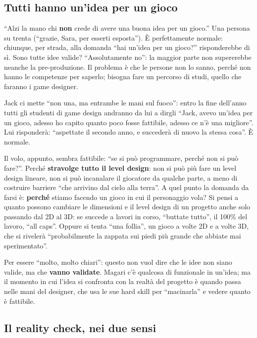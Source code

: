\subsection{Tutti hanno un'idea per un gioco}

``Alzi la mano chi \textbf{non} crede di avere una buona idea per un gioco.''
Una persona su trenta (``grazie, Sara, per esserti esposta''). È
perfettamente normale: chiunque, per strada, alla domanda ``hai un'idea per
un gioco?'' risponderebbe di sì. Sono tutte idee valide? ``Assolutamente
no'': la maggior parte non supererebbe neanche la pre-produzione. Il problema
è che le persone non lo sanno, perché non hanno le competenze per saperlo;
bisogna fare un percorso di studi, quello che faranno i game designer.

Jack ci mette ``non una, ma entrambe le mani sul fuoco'': entro la fine
dell'anno tutti gli studenti di game design andranno da lui a dirgli ``Jack,
avevo un'idea per un gioco, adesso ho capito quanto poco fosse fattibile,
adesso ce n'è una migliore''. Lui risponderà: ``aspettate il secondo anno, e
succederà di nuovo la stessa cosa''. È normale.

Il volo, appunto, sembra fattibile: ``se si può programmare, perché non si
può fare?''. Perché \textbf{stravolge tutto il level design}: non si può più
fare un level design lineare, non si può incanalare il giocatore da qualche
parte, a meno di costruire barriere ``che arrivino dal cielo alla terra''. A
quel punto la domanda da farsi è: \textbf{perché} stiamo facendo un gioco in
cui il personaggio vola? Si pensi a quanto possono cambiare le dimensioni e
il level design di un progetto anche solo passando dal 2D al 3D: se succede a
lavori in corso, ``buttate tutto'', il 100\% del lavoro, ``all caps''. Oppure
si tenta ``una follia'', un gioco a volte 2D e a volte 3D, che si rivelerà
``probabilmente la zappata sui piedi più grande che abbiate mai
sperimentato''.

Per essere ``molto, molto chiari'': questo non vuol dire che le idee non
siano valide, ma che \textbf{vanno validate}. Magari c'è qualcosa di
funzionale in un'idea; ma il momento in cui l'idea si confronta con la realtà
del progetto è quando passa nelle mani del designer, che usa le sue hard
skill per ``macinarla'' e vedere quanto è fattibile.

\subsection{Il reality check, nei due sensi}

